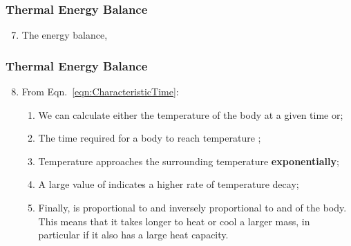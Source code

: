 \documentclass[10pt,compress,handout,unknownkeysallowed]{beamer}
\begin{document}
\begin{frame}
 \frametitle{Thermal Energy Balance}
   \begin{enumerate}\setcounter{enumi}{6}%
     \item<1-> The energy balance,
   \end{enumerate}
\end{frame}

\begin{frame}
 \frametitle{Thermal Energy Balance}
   \begin{enumerate}\setcounter{enumi}{7}%
     \item<1-> From Eqn.~\ref{eqn:CharacteristicTime}:
        \begin{enumerate}%
           \item<1-> We can calculate either the temperature  of the body at a given time  or;
           \item<2-> The time  required for a body to reach temperature ;
           \item<3-> Temperature  approaches the surrounding temperature  {\bf exponentially};
           \item<4-> A large value of  indicates a higher rate of temperature decay;
           \item<5-> Finally,  is proportional to  and inversely proportional to  and  of the body. This means that it takes longer to heat or cool a larger mass, in particular if it also has a large heat capacity.
        \end{enumerate}
   \end{enumerate}
\end{frame}
\end{document}
